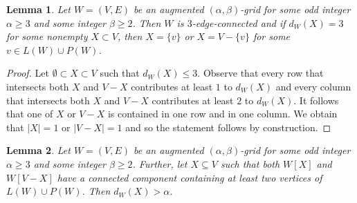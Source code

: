 \documentclass[a4paper,12pt,makeidx]{article}
\newtheorem{lemma}{Lemma}
\begin{document}
\begin{lemma}\label{34conn}
Let $W=(V,E)$ be an augmented $(\alpha,\beta)$-grid for some odd integer $\alpha \geq 3$ and some integer $\beta \geq 2$. Then $W$ is $3$-edge-connected and if $d_W(X)=3$ for some nonempty $X \subset V$, then $X=\{v\}$ or $X=V-\{v\}$ for some $v\in L(W)\cup P(W)$.
\end{lemma}
\begin{proof}
Let $\emptyset \subset X \subset V$ such that $d_W(X)\leq3$. Observe that every row that intersects both $X$ and $V-X$ contributes at least $1$ to $d_W(X)$ and every column that intersects both $X$ and $V-X$ contributes at least $2$ to $d_W(X)$. It follows that one of $X$ or $V-X$ is contained in one row and in one column. We obtain that $|X|=1$ or $|V-X|=1$ and so the statement follows by construction. 
\end{proof}
\begin{lemma}\label{big}
Let $W=(V,E)$ be an augmented $(\alpha,\beta)$-grid for some odd integer $\alpha \geq 3$ and some integer $\beta \geq 2$. Further, let $X \subseteq V$ such that both $W[X]$ and $W[V-X]$ have a connected component containing at least two vertices of $L(W)\cup P(W)$. Then $d_W(X)>\alpha$.
\end{lemma}
\end{document}
